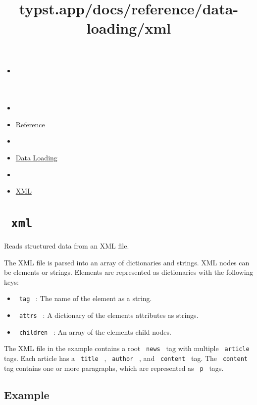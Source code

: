 \title{typst.app/docs/reference/data-loading/xml}

\begin{itemize}
\tightlist
\item
  \href{/docs}{}
\item
  
\item
  \href{/docs/reference/}{Reference}
\item
  
\item
  \href{/docs/reference/data-loading/}{Data Loading}
\item
  
\item
  \href{/docs/reference/data-loading/xml/}{XML}
\end{itemize}

\section{\texorpdfstring{\texttt{\ xml\ }}{ xml }}\label{summary}

Reads structured data from an XML file.

The XML file is parsed into an array of dictionaries and strings. XML
nodes can be elements or strings. Elements are represented as
dictionaries with the following keys:

\begin{itemize}
\tightlist
\item
  \texttt{\ tag\ } : The name of the element as a string.
\item
  \texttt{\ attrs\ } : A dictionary of the element\textquotesingle s
  attributes as strings.
\item
  \texttt{\ children\ } : An array of the element\textquotesingle s
  child nodes.
\end{itemize}

The XML file in the example contains a root \texttt{\ news\ } tag with
multiple \texttt{\ article\ } tags. Each article has a
\texttt{\ title\ } , \texttt{\ author\ } , and \texttt{\ content\ } tag.
The \texttt{\ content\ } tag contains one or more paragraphs, which are
represented as \texttt{\ p\ } tags.

\subsection{Example}\label{example}


